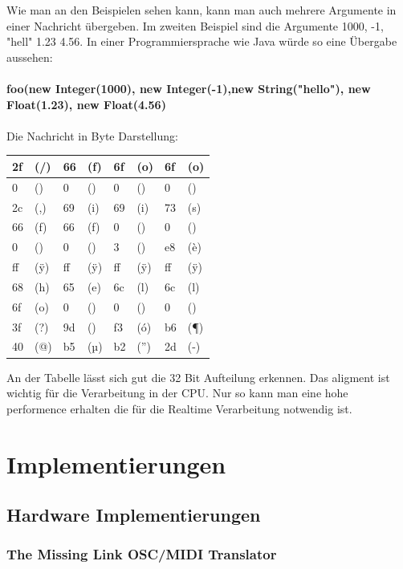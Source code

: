 \documentclass[a4paper, 12pt]{article}
\begin{document}
Wie man an den Beispielen sehen kann, kann man auch mehrere Argumente in einer Nachricht übergeben. Im zweiten Beispiel sind die Argumente 1000, -1, "hell" 1.23 4.56.
In einer Programmiersprache wie Java würde so eine Übergabe aussehen: \\
\\
{\bf foo(new Integer(1000), new Integer(-1),new String("hello"), new Float(1.23), new Float(4.56)}\\
\\
Die Nachricht in Byte Darstellung:
\begin{table}[ht]
\centering
\begin{tabular}{|p{0.5cm}|p{1.5cm}|p{0.5cm}|p{1.5cm}|p{0.5cm}|p{1.5cm}|p{0.5cm}|p{1.5cm}|}
\hline
 2f & (/) & 66 & (f) & 6f & (o) & 6f & (o)\\ \hline
 0 & () & 0 & () & 0 & () & 0 & ()\\ \hline
 2c & (,) & 69 & (i) & 69 & (i) & 73 & (s) \\ \hline
 66 & (f) & 66 & (f) & 0 & () & 0 & () \\ \hline
 0 & () & 0 & () & 3 & () & e8 & (è) \\ \hline
 ff & (ÿ) & ff & (ÿ) & ff & (ÿ) & ff & (ÿ) \\
 68 & (h) & 65 & (e) & 6c & (l) & 6c & (l) \\ \hline
 6f & (o) & 0 & () & 0 & () & 0 & () \\ \hline
 3f & (?) & 9d & () & f3 & (ó) & b6 & (¶) \\ \hline
 40 & (@) & b5 & (µ) & b2 & (”) & 2d & (-) \\ \hline
\end{tabular}
\end{table}
\newpage
An der Tabelle lässt sich gut die 32 Bit Aufteilung erkennen.
Das aligment ist wichtig für die Verarbeitung in der CPU. Nur so kann man eine hohe performence erhalten die für die Realtime Verarbeitung notwendig ist. 

\section{Implementierungen}
\subsection{Hardware Implementierungen}
\subsubsection{The Missing Link OSC/MIDI Translator}
\end{document}
